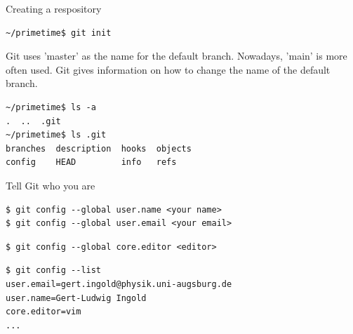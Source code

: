 \documentclass[svgnames]{beamer}
\begin{document}
\begin{frame}[fragile]{Creating a respository}

 \begin{lstlisting}
~/primetime$ git init
 \end{lstlisting}

Git uses 'master' as the name for the default branch. Nowadays, 'main' is more
often used. Git gives information on how to change the name of the default branch.

 \vspace{\baselineskip}
 \begin{lstlisting}
~/primetime$ ls -a
.  ..  .git
~/primetime$ ls .git
branches  description  hooks  objects
config    HEAD         info   refs
 \end{lstlisting}

 \begin{center}
 \end{center}
\end{frame}

\begin{frame}[fragile]{Tell Git who you are}

 \begin{lstlisting}
$ git config --global user.name <your name>
$ git config --global user.email <your email>
 \end{lstlisting}

 \vspace{\baselineskip}
 \begin{lstlisting}
$ git config --global core.editor <editor>
 \end{lstlisting}

 \vspace{\baselineskip}
 \begin{lstlisting}
$ git config --list
user.email=gert.ingold@physik.uni-augsburg.de
user.name=Gert-Ludwig Ingold
core.editor=vim
...
 \end{lstlisting}
\end{frame}
\end{document}
